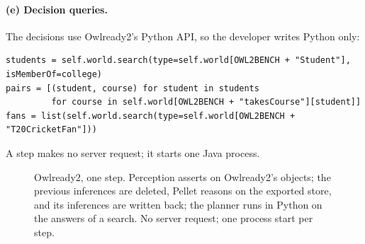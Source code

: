 \documentclass[10pt]{article}
\newcommand{\brkunderscore}{\textunderscore\allowbreak}
\newcommand{\code}[1]{{\let\_\brkunderscore\texttt{#1}}}
\def\cA{1.55}\def\cB{4.05}\def\cC{6.55}\def\cD{9.05}\def\cE{11.55}\def\cF{14.05}
\def\yP{0.85}\def\yX{-1.5}
\newcommand{\headers}[6]{%
  \node[head] at (\cA,2.45) {#1}; \node[head] at (\cB,2.45) {#2}; \node[head] at (\cC,2.45) {#3};
  \node[head] at (\cD,2.45) {#4}; \node[head] at (\cE,2.45) {#5}; \node[head] at (\cF,2.45) {#6};}
\newcommand{\pylane}[1]{%
  \draw[lane=pyline, fill=pyfill] (0,0) rectangle (15.4,2.15);
  \node[lanelabel, text=pyline] at (0,2.15) {#1};}
\newcommand{\exlane}[2][solid]{%
  \draw[lane=exline, fill=exfill, #1] (0,-2.8) rectangle (15.4,-0.55);
  \node[lanelabel, text=exline, anchor=south west] at (0,-2.8) {#2};}
\newcommand{\tagS}[1]{\node[badge=tagS, anchor=south east] at ([xshift=-1pt,yshift=1pt]#1.north east) {S};}
\newcommand{\tagMP}[1]{\node[badge=tagP, anchor=south east] at ([xshift=-1pt,yshift=1pt]#1.north east) {P};
  \node[badge=tagM, anchor=south east] at ([xshift=-10pt,yshift=1pt]#1.north east) {M};}
\begin{document}
\paragraph{(e) Decision queries.} The decisions use Owlready2's Python API, so the developer writes Python only:
\begin{lstlisting}[style=py]
students = self.world.search(type=self.world[OWL2BENCH + "Student"], isMemberOf=college)
pairs = [(student, course) for student in students
         for course in self.world[OWL2BENCH + "takesCourse"][student]]
fans = list(self.world.search(type=self.world[OWL2BENCH + "T20CricketFan"]))
\end{lstlisting}
A step makes no server request; it starts one Java process.

\begin{figure}[t]
\centering
{}
\caption{Owlready2, one step. Perception asserts on Owlready2's objects; the previous inferences are deleted, Pellet
reasons on the exported store, and its inferences are written back; the planner runs in Python on the answers of a
search. No server request; one process start per step.}
\label{fig:owlready2}
\end{figure}
\end{document}
